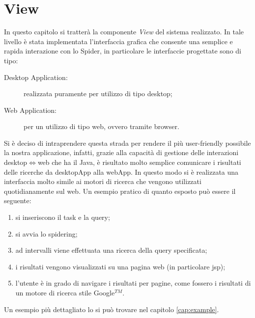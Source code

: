 \chapter{View}\label{cap:view}
In questo capitolo si tratterà la componente \textit{View} del sistema realizzato. In tale livello è stata implementata l'interfaccia grafica che consente una semplice e rapida interazione con lo Spider, in particolare le interfaccie progettate sono di tipo:
\begin{description}
\item[Desktop Application:] realizzata puramente per utilizzo di tipo desktop;
\item[Web Application:] per un utilizzo di tipo web, ovvero tramite browser.
\end{description}
Si è deciso di intraprendere questa strada per rendere il più user-friendly possibile la nostra applicazione, infatti, grazie alla capacità di gestione delle interazioni desktop$\Leftrightarrow$web che ha il Java, è risultato molto semplice comunicare i risultati delle ricerche da desktopApp alla webApp. In questo modo si è realizzata una interfaccia molto simile ai motori di ricerca che vengono utilizzati quotidianamente sul web. Un esempio pratico di quanto esposto può essere il seguente:
\begin{enumerate}
\item si inseriscono il task e la query;
\item si avvia lo spidering;
\item ad intervalli viene effettuata una ricerca della query specificata;
\item i risultati vengono visualizzati su una pagina web (in particolare jsp);
\item l'utente è in grado di navigare i risultati per pagine, come fossero i risultati di un motore di ricerca stile Google$^{TM}$.
\end{enumerate}
Un esempio più dettagliato lo si può trovare nel capitolo \ref{cap:example}.
